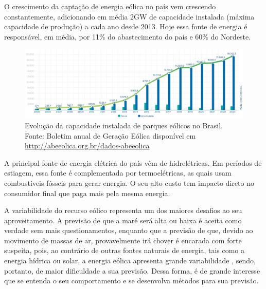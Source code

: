 \documentclass[
	12pt,				%
	openright,			%
	oneside,			%
	a4paper,			%
	english,			%
	french,				%
	spanish,			%
	brazil				%
	]{abntex2}
\begin{document}
O crescimento da captação de energia eólica no país vem crescendo constantemente, adicionando em média 2GW de capacidade instalada (máxima capacidade de produção) a cada ano desde 2013. Hoje essa fonte de energia é responsável, em média, por 11\% do abastecimento do país e 60\% do Nordeste.

\begin{figure}[h]
    \centering
	\includegraphics[width=\textwidth]{abe_evolucao_capacidade_instalada}
	\caption{Evolução da capacidade instalada de parques eólicos no Brasil. Fonte: Boletim anual de Geração Eólica disponível em \url{http://abeeolica.org.br/dados-abeeolica}} 
\end{figure}
\FloatBarrier

A principal fonte de energia elétrica do país vêm de hidrelétricas. Em períodos de estiagem, essa fonte é complementada por termoelétricas, as quais usam combustíveis fósseis para gerar energia. O seu alto custo tem impacto direto no consumidor final que paga mais pela mesma energia. 

A variabilidade do recurso eólico representa um dos maiores desafios ao seu aproveitamento. A previsão de que a maré será alta ou baixa é aceita como verdade sem mais questionamentos, enquanto que a previsão de que, devido ao movimento de massas de ar, provavelmente irá chover é encarada com forte suspeita, pois, ao contrário de outras fontes naturais de energia, tais como a energia hídrica ou solar, a energia eólica apresenta grande variabilidade \cite{thomas}, sendo, portanto, de maior dificuldade a sua previsão. Dessa forma, é de grande interesse que se entenda o seu comportamento e se desenvolva métodos para sua previsão.

\end{document}
